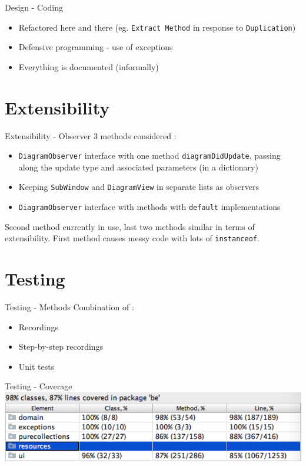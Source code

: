 \documentclass[10pt]{beamer}
\begin{document}
\begin{frame}[fragile]{Design - Coding}
\begin{itemize}
\item Refactored here and there (eg. \texttt{Extract Method} in response to \texttt{Duplication})
\item Defensive programming - use of exceptions
\item Everything is documented (informally)
\end{itemize}
\end{frame}

\section{Extensibility}

\begin{frame}[fragile]{Extensibility - Observer}
3 methods considered :
\begin{itemize}
\item \texttt{DiagramObserver} interface with one method \texttt{diagramDidUpdate}, passing along the update type and associated parameters (in a dictionary)
\item Keeping \texttt{SubWindow} and \texttt{DiagramView} in separate lists as observers
\item \texttt{DiagramObserver} interface with methods with \texttt{default} implementations
\end{itemize}
Second method currently in use, last two methods similar in terms of extensibility. First method causes messy code with lots of \texttt{instanceof}.
\end{frame}

\section{Testing}

\begin{frame}[fragile]{Testing - Methods}
Combination of :
\begin{itemize}
\item Recordings
\item Step-by-step recordings
\item Unit tests
\end{itemize}
\end{frame}

\begin{frame}[fragile]{Testing - Coverage}
\includegraphics[width=1\textwidth]{coverage}
\end{frame}
\end{document}
